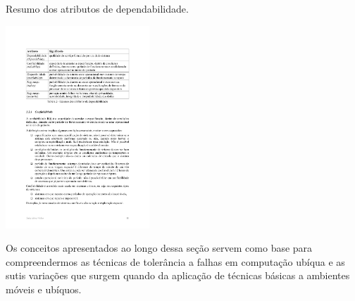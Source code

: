 \begin{table}
\begin{center}
\caption{Resumo dos atributos de dependabilidade.}\label{tab:dependabilidade}

	\includegraphics[height=3in]{figuras/tabela_weber.pdf}

\end{center}
\end{table}

Os conceitos apresentados ao longo dessa seção servem como base para compreendermos as técnicas de tolerância a falhas em computação ubíqua e as sutis variações que surgem quando da aplicação de técnicas básicas a ambientes móveis e ubíquos.